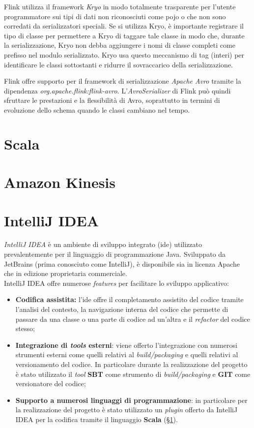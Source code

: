 \label{sec:kryo}
Flink utilizza il \gls{framework} \textit{Kryo} in modo totalmente trasparente per l'utente programmatore sui tipi di dati non riconosciuti come \gls{pojo} o che non sono corredati da serializzatori speciali. Se si utilizza Kryo, è importante registrare il tipo di classe per permettere a Kryo di taggare tale classe in modo che, durante la \gls{serializzazione}, Kryo non debba aggiungere i nomi di classe completi come prefisso nel modulo serializzato. Kryo usa questo meccanismo di tag (interi) per identificare le classi sottostanti e ridurre il sovraccarico della \gls{serializzazione}.



\label{sec:avro}
Flink offre supporto per il \gls{framework} di \gls{serializzazione} \textit{Apache Avro} tramite la dipendenza \textit{org.apache.flink:flink-avro}. L'\textit{AvroSerializer} di Flink può quindi sfruttare le prestazioni e la flessibilità di Avro, soprattutto in termini di evoluzione dello schema quando le classi cambiano nel tempo.
\section{Scala}\label{sec:scala}

\section{Amazon Kinesis}

\section{IntelliJ IDEA}
\textit{IntelliJ IDEA} è un ambiente di sviluppo integrato (\gls{ide}) utilizzato prevalentemente per il linguaggio di programmazione Java. Sviluppato da JetBrains (prima conosciuto come IntelliJ), è disponibile sia in licenza Apache che in edizione proprietaria commerciale.\\
IntelliJ IDEA offre numerose \textit{features} per facilitare lo sviluppo applicativo:
\begin{itemize}
	\item{\textbf{Codifica assistita:} l'\gls{ide} offre il completamento assistito del codice tramite l'analisi del contesto, la navigazione interna del codice che permette di passare da una classe o una parte di codice ad un'altra e il \textit{refactor} del codice stesso;}
	\item{\textbf{Integrazione di \textit{tools} esterni}: viene offerto l'integrazione con numerosi strumenti esterni come quelli relativi al \textit{build/packaging} e quelli relativi al versionamento del codice. In particolare durante la realizzazione del progetto è stato utilizzato il \textit{tool} \textbf{SBT} come strumento di \textit{build/packaging} e \textbf{GIT} come versionatore del codice;}
	\item{\textbf{Supporto a numerosi linguaggi di programmazione}: in particolare per la realizzazione del progetto è stato utilizzato un \textit{plugin} offerto da IntelliJ IDEA per la codifica tramite il linguaggio \textbf{Scala} (\S\ref{sec:scala}).}
\end{itemize}

